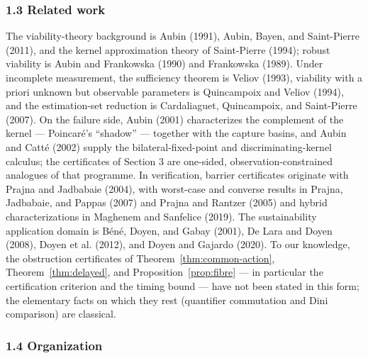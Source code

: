 \documentclass[10pt,twocolumn]{article}
\theoremstyle{definition}
\begin{document}
\subsubsection{1.3 Related work}\label{related-work}

The viability-theory background is Aubin (1991), Aubin, Bayen, and Saint-Pierre (2011), and the kernel approximation theory of Saint-Pierre (1994); robust viability is Aubin and Frankowska (1990) and Frankowska (1989). Under incomplete measurement, the sufficiency theorem is Veliov (1993), viability with a priori unknown but observable parameters is Quincampoix and Veliov (1994), and the estimation-set reduction is Cardaliaguet, Quincampoix, and Saint-Pierre (2007). On the failure side, Aubin (2001) characterizes the complement of the kernel --- Poincar\'e's ``shadow'' --- together with the capture basins, and Aubin and Catt\'e (2002) supply the bilateral-fixed-point and discriminating-kernel calculus; the certificates of Section 3 are one-sided, observation-constrained analogues of that programme. In verification, barrier certificates originate with Prajna and Jadbabaie (2004), with worst-case and converse results in Prajna, Jadbabaie, and Pappas (2007) and Prajna and Rantzer (2005) and hybrid characterizations in Maghenem and Sanfelice (2019). The sustainability application domain is B\'en\'e, Doyen, and Gabay (2001), De Lara and Doyen (2008), Doyen et al. (2012), and Doyen and Gajardo (2020). To our knowledge, the obstruction certificates of Theorem~\ref{thm:common-action}, Theorem~\ref{thm:delayed}, and Proposition~\ref{prop:fibre} --- in particular the certification criterion and the timing bound --- have not been stated in this form; the elementary facts on which they rest (quantifier commutation and Dini comparison) are classical.

\subsubsection{1.4 Organization}\label{organization}
\end{document}
